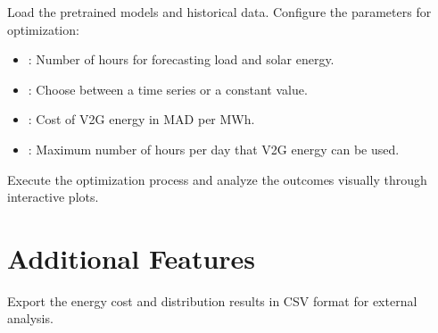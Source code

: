 \documentclass[letterpaper,10pt,english]{sphinxmanual}
\begin{document}
\sphinxAtStartPar
Load the pre\sphinxhyphen{}trained models and historical data. Configure the parameters for optimization:
\begin{itemize}
\item {} 
\sphinxAtStartPar
{}: Number of hours for forecasting load and solar energy.

\item {} 
\sphinxAtStartPar
{}: Choose between a time series or a constant value.

\item {} 
\sphinxAtStartPar
{}: Cost of V2G energy in MAD per MWh.

\item {} 
\sphinxAtStartPar
{}: Maximum number of hours per day that V2G energy can be used.

\end{itemize}


\begin{DUlineblock}{0em}
\item[] 
\end{DUlineblock}

\sphinxAtStartPar
{}

\sphinxAtStartPar
Execute the optimization process and analyze the outcomes visually through interactive plots.


\begin{DUlineblock}{0em}
\item[] 
\end{DUlineblock}


\section{Additional Features}
\label{\detokenize{index:additional-features}}
\sphinxAtStartPar
{}

\sphinxAtStartPar
Export the energy cost and distribution results in CSV format for external analysis.
\end{document}
